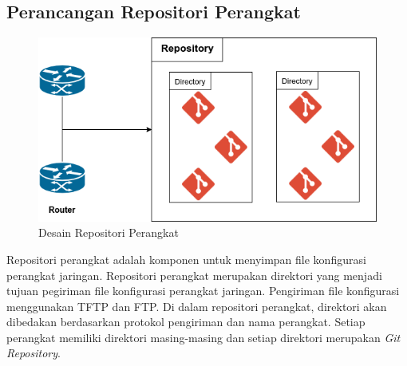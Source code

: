 		\subsection{Perancangan Repositori Perangkat }
			\begin{figure}[H]
				\centering
				\includegraphics[width=\textwidth]{Images/C-3/Repository.png}
				\caption{Desain Repositori Perangkat}
				\label{DesainRepositoriPerangkat}
			\end{figure}
			Repositori perangkat adalah komponen untuk menyimpan file konfigurasi perangkat jaringan. Repositori perangkat merupakan direktori yang menjadi tujuan pegiriman file konfigurasi perangkat jaringan. Pengiriman file konfigurasi menggunakan TFTP dan FTP. Di dalam repositori perangkat, direktori akan dibedakan berdasarkan protokol pengiriman dan nama perangkat. Setiap perangkat memiliki direktori masing-masing dan setiap direktori merupakan \textit{Git Repository}.\\ 

		
            
